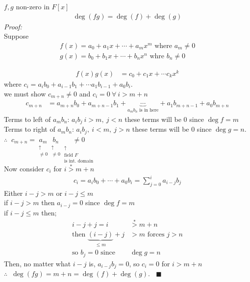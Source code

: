 \setcounter{section}{9}
\begin{lemma}
    $f,g$ non-zero in $F[x]$
    \begin{align}
        \deg(fg)= \deg(f)+\deg(g) \nonumber
    \end{align}
    \textit{Proof:} \\
    \noindent Suppose 
    \begin{align}
        f(x)= a_0 +a_1x+\cdots + a_mx^m \text{ where } a_m \neq 0 \nonumber \\
        g(x)= b_0 +b_1x + \cdots + b_nx^n \text{ whre } b_n\neq 0 \nonumber
    \end{align}

    \begin{align}
        f(x)g(x) &= c_0 + c_1x + \cdots c_kx^k \nonumber
    \end{align}
    where $c_i = a_ib_0 + a_{i-1}b_1 + \cdots a_1b_{i-1} + a_0 b_i$. \\
    \noindent we must show $c_{m+n}\neq 0$ and $c_i = 0 \ \forall \ i >m+n$
    \begin{align}
        c_{m+n} &= a_{m+n} b_0 + a_{m+n-1}b_1 + \underbrace{\cdots}_{a_mb_n \text{ is in here}}+ a_1b_{m+n-1}+a_0b_{m+n} \nonumber
    \end{align}
    Terms to left of $a_mb_n$: $a_ib_j \ i>m, \ j <n$ these terms will be $0$ since $\deg f = m$ \\
    \noindent Terms to right of $a_mb_n$: $a_ib_j, \ i<m, \ j>n$ these terms will be $0$ since $\deg g = n$. \\

    $\therefore \ $ $c_{m+n}=\underset{\substack{\uparrow \\ \neq 0}}{a_m}\underset{\substack{\uparrow \\ \neq 0}}{b_n} \underset{\substack{\uparrow \ \ \\ \text{field }F \\ \text{is int. domain}}}{\neq 0} $ \\
    Now consider $c_i$ for $i\overset{*}{>}m+n$ 
    \begin{align}
        c_i = a_ib_0 + \cdots + a_0b_i = \sum_{j=0}^i a_{i-j}b_j \nonumber
    \end{align}
    Either $i-j>m$ or $i-j \leq m$ \\
    \noindent if $i-j>m$ then $a_{i-j}=0$ since $\deg f = m$ \\
    \noindent if $i-j \leq m$ then;
    \begin{align}
        i-j + j = i &\overset{*}{>} m + n \nonumber \\
        \text{then } \underbrace{(i-j)}_{\leq m} +j &> m  \text{ forces }j>n \nonumber \\
        \text{so }b_j = 0 \text{ since } &\deg g = n  \nonumber
    \end{align}
    Then, no matter what $i-j$ is, $a_{i-j}b_j=0$, so $c_i=0$ for $i>m+n$ \\ \steezybreak
    $\therefore \ $ $\deg (fg) = m + n = \deg(f)+\deg(g). \ \ \ \ \blacksquare$
\end{lemma}
